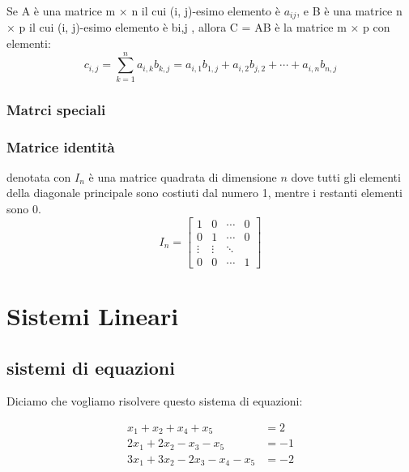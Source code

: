 \documentclass{report}
\begin{document}
  \begin{tcolorbox}
    Se A è una matrice m × n
il cui (i, j)-esimo elemento è \(a_{ij}\), e B è una matrice n × p il cui (i, j)-esimo elemento
è bi,j , allora C = AB è la matrice m × p con elementi:
\begin{equation}
c_{i,j} =   \sum_{k=1}^n {a_{i,k}b_{k,j}} = a_{i,1}b_{1,j}+a_{i,2}b_{j,2} + \cdots +a_{i,n}b_{n,j}
  \end{equation}
\end{tcolorbox}
\subsection{Matrci speciali}
\subsection{Matrice identità}
denotata con \(I_n\) è una matrice quadrata di dimensione \(n\) dove tutti gli elementi della diagonale principale sono costiuti dal numero 1, mentre i restanti elementi sono 0.
\begin{equation}
I_n = \begin{bmatrix}
  1 & 0 & \cdots & 0\\
  0 & 1 & \cdots & 0\\
  \vdots & \vdots & \ddots\\
  0 & 0 & \cdots & 1
\end{bmatrix}
\end{equation}

\chapter{Sistemi Lineari}
\section{sistemi di equazioni}
Diciamo che vogliamo risolvere questo sistema di equazioni:

\begin{align*}
x_1+x_2 + x_4 + x_5&= 2\\
2x_1+2x_2-x_3-x_5&=-1 \\
3x_1+3x_2-2x_3-x_4-x_5 &= -2
\end{align*}
\end{document}
